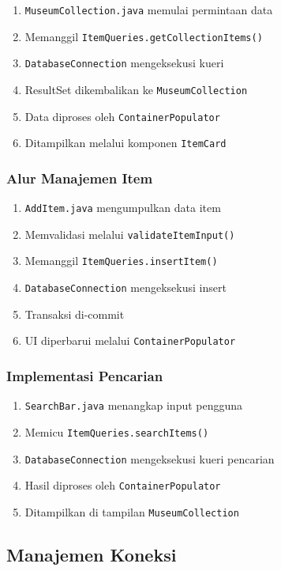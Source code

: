 \documentclass[12pt,a4paper]{article}
\begin{document}
\begin{enumerate}
    \item \texttt{MuseumCollection.java} memulai permintaan data
    \item Memanggil \texttt{ItemQueries.getCollectionItems()}
    \item \texttt{DatabaseConnection} mengeksekusi kueri
    \item ResultSet dikembalikan ke \texttt{MuseumCollection}
    \item Data diproses oleh \texttt{ContainerPopulator}
    \item Ditampilkan melalui komponen \texttt{ItemCard}
\end{enumerate}

\subsubsection{Alur Manajemen Item}
\begin{enumerate}
    \item \texttt{AddItem.java} mengumpulkan data item
    \item Memvalidasi melalui \texttt{validateItemInput()}
    \item Memanggil \texttt{ItemQueries.insertItem()}
    \item \texttt{DatabaseConnection} mengeksekusi insert
    \item Transaksi di-commit
    \item UI diperbarui melalui \texttt{ContainerPopulator}
\end{enumerate}

\subsubsection{Implementasi Pencarian}
\begin{enumerate}
    \item \texttt{SearchBar.java} menangkap input pengguna
    \item Memicu \texttt{ItemQueries.searchItems()}
    \item \texttt{DatabaseConnection} mengeksekusi kueri pencarian
    \item Hasil diproses oleh \texttt{ContainerPopulator}
    \item Ditampilkan di tampilan \texttt{MuseumCollection}
\end{enumerate}

\subsection{Manajemen Koneksi}
\end{document}
